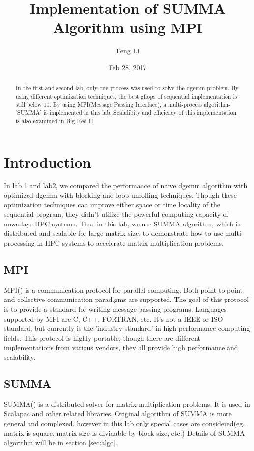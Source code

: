 \documentclass{ics-paper}
\author{Feng Li}
\date{Feb 28, 2017}
\title{\textbf{\sffamily Implementation of SUMMA Algorithm using MPI}}
\begin{document}
\maketitle
\thispagestyle{firstpage}

\begin{abstract}
In the first and second lab, only one process was used to solve the dgemm problem. By using different optimization techniques, the best gflops of sequential implementation is still below 10. By using MPI(Message Passing Interface), a multi-process algorithm- ‘SUMMA’ is implemented in this lab. Scalalibity and efficiency of this implementation is also examined in Big Red II. 
\end{abstract}

\section{Introduction}
In lab 1 and lab2, we compared the performance of naive dgemm algorithm with optimized dgemm with blocking and loop-unrolling techniques. Though these optimization techniques can improve either space or time locality of the sequential program, they didn't utilize the powerful computing capacity of nowadays HPC systems. Thus in this lab, we use SUMMA algorithm, which is distributed and scalable for large matrix size, to demonstrate how to use multi-processing in HPC systems to accelerate matrix multiplication problems. 
\subsection{MPI}
MPI(\cite{gropp1996high}) is a communication protocol for parallel computing. Both point-to-point and collective communication paradigms are supported. The goal of this protocol is to provide a standard for writing message passing programs. Languages supported by MPI are C, C++, FORTRAN, etc. It's not a IEEE or ISO standard, but currently is the 'industry standard' in high performance computing fields. This protocol is highly portable, though there are different implementations from various vendors, they all provide high performance and scalability.
\subsection{SUMMA}
SUMMA(\cite{van1997summa}) is a distributed solver for matrix multiplication problems. It is used in Scalapac and other related libraries. Original algorithm of SUMMA is more general and complexed, however in this lab only special cases are considered(eg. matrix is square, matrix size is dividable by block size, etc.) Details of SUMMA algorithm will be in section \ref{sec:algo}.
\end{document}
